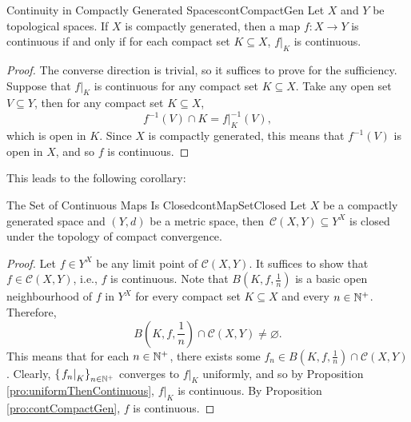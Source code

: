 \documentclass[math]{amznotes}
\theoremstyle{remark}
\begin{document}
\begin{probox}{Continuity in Compactly Generated Spaces}{contCompactGen}
    Let $X$ and $Y$ be topological spaces. If $X$ is compactly generated, then a map $f \colon X \to Y$ is continuous if and only if for each compact set $K \subseteq X$, $\left.f\right\rvert_K$ is continuous.
    \tcblower
    \begin{proof}
        The converse direction is trivial, so it suffices to prove for the sufficiency. Suppose that $\left.f\right\rvert_K$ is continuous for any compact set $K \subseteq X$. Take any open set $V \subseteq Y$, then for any compact set $K \subseteq X$, 
        \begin{equation*}
            f^{-1}\left(V\right) \cap K = \left.f\right\rvert_K^{-1}\left(V\right),
        \end{equation*}
        which is open in $K$. Since $X$ is compactly generated, this means that $f^{-1}\left(V\right)$ is open in $X$, and so $f$ is continuous.
    \end{proof}
\end{probox}
This leads to the following corollary:
\begin{corbox}{The Set of Continuous Maps Is Closed}{contMapSetClosed}
    Let $X$ be a compactly generated space and $\left(Y, d\right)$ be a metric space, then~$\mathcal{C}\left(X, Y\right) \subseteq Y^X$ is closed under the topology of compact convergence.
    \tcblower
    \begin{proof}
        Let $f \in Y^X$ be any limit point of $\mathcal{C}\left(X, Y\right)$. It suffices to show that $f \in \mathcal{C}\left(X, Y\right)$, i.e., $f$ is continuous. Note that $B\left(K, f, \frac{1}{n}\right)$ is a basic open neighbourhood of $f$ in $Y^X$ for every compact set $K \subseteq X$ and every $n \in \mathbb{N}^+$. Therefore, 
        \begin{equation*}
            B\left(K, f, \frac{1}{n}\right) \cap \mathcal{C}\left(X, Y\right) \neq \varnothing.
        \end{equation*}
        This means that for each $n \in \mathbb{N}^+$, there exists some $f_n \in B\left(K, f, \frac{1}{n}\right) \cap \mathcal{C}\left(X, Y\right)$. Clearly, $\left\{\left.f_n\right\rvert_K\right\}_{n \in \mathbb{N}^+}$ converges to $\left.f\right\rvert_K$ uniformly, and so by Proposition \ref{pro:uniformThenContinuous}, $\left.f\right\rvert_K$ is continuous. By Proposition \ref{pro:contCompactGen}, $f$ is continuous.
    \end{proof}
\end{corbox}
\end{document}

